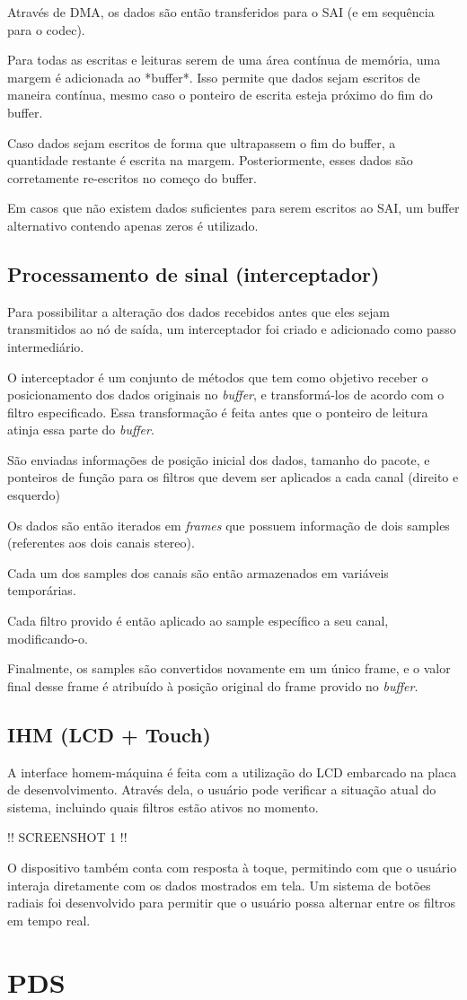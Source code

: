 Através de DMA, os dados são então transferidos para o SAI (e em sequência para o codec).

Para todas as escritas e leituras serem de uma área contínua de memória, uma margem é adicionada ao *buffer*. Isso permite que dados sejam escritos de maneira contínua, mesmo caso o ponteiro de escrita esteja próximo do fim do buffer.

Caso dados sejam escritos de forma que ultrapassem o fim do buffer, a quantidade restante é escrita na margem. Posteriormente, esses dados são corretamente re-escritos no começo do buffer. 

Em casos que não existem dados suficientes para serem escritos ao SAI, um buffer alternativo contendo apenas zeros é utilizado.


\subsection{Processamento de sinal (interceptador)}
Para possibilitar a alteração dos dados recebidos antes que eles sejam transmitidos ao nó de saída, um interceptador foi criado e adicionado como passo intermediário.

O interceptador é um conjunto de métodos que tem como objetivo receber o posicionamento dos dados originais no \textit{buffer}, e transformá-los de acordo com o filtro especificado. Essa transformação é feita antes que o ponteiro de leitura atinja essa parte do \textit{buffer}.

São enviadas informações de posição inicial dos dados, tamanho do pacote, e ponteiros de função para os filtros que devem ser aplicados a cada canal (direito e esquerdo)

Os dados são então iterados em \textit{frames} que possuem informação de dois samples (referentes aos dois canais stereo).

Cada um dos samples dos canais são então armazenados em variáveis temporárias. 

Cada filtro provido é então aplicado ao sample específico a seu canal, modificando-o. 

Finalmente, os samples são convertidos novamente em um único frame, e o valor final desse frame é atribuído à posição original do frame provido no \textit{buffer}.

\subsection{IHM (LCD + Touch)}
A interface homem-máquina é feita com a utilização do LCD embarcado na placa de desenvolvimento. Através dela, o usuário pode verificar a situação atual do sistema, incluindo quais filtros estão ativos no momento.

!! SCREENSHOT 1 !!

O dispositivo também conta com resposta à toque, permitindo com que o usuário interaja diretamente com os dados mostrados em tela. Um sistema de botões radiais foi desenvolvido para permitir que o usuário possa alternar entre os filtros em tempo real.

\section{PDS}
